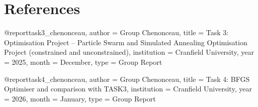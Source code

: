 \section{References}
\printbibliography[heading=none]
@report{task3_chenonceau,
    author = {{Group Chenonceau}},
    title = {Task 3: Optimisation Project -- Particle Swarm and Simulated Annealing Optimisation Project (constrained and unconstrained)},
    institution = {Cranfield University},
    year = {2025},
    month = {December},
    type = {Group Report}
}

@report{task4_chenonceau,
    author = {{Group Chenonceau}},
    title = {Task 4: BFGS Optimiser and comparison with TASK3},
    institution = {Cranfield University},
    year = {2026},
    month = {January},
    type = {Group Report}
}